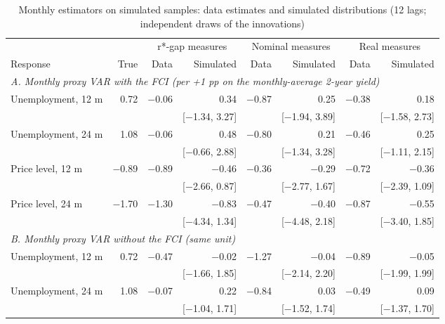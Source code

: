 \begin{table}[H]\centering\footnotesize\setlength{\tabcolsep}{3pt}
\caption{Monthly estimators on simulated samples: data estimates and simulated distributions (12 lags; independent draws of the innovations)}\label{tab:monthlyirfsimiid}
\begin{tabular}{lrrrrrrr}\toprule & & \multicolumn{2}{c}{r*-gap measures} & \multicolumn{2}{c}{Nominal measures} & \multicolumn{2}{c}{Real measures}\\ \cmidrule(lr){3-4}\cmidrule(lr){5-6}\cmidrule(lr){7-8}
Response & True & Data & Simulated & Data & Simulated & Data & Simulated\\ \midrule
\multicolumn{8}{l}{\textit{A. Monthly proxy VAR with the FCI (per +1 pp on the monthly-average 2-year yield)}}\\
\quad Unemployment, 12 m & 0.72 & $-$0.06 & 0.34 & $-$0.87 & 0.25 & $-$0.38 & 0.18\\
 &  &  & {\scriptsize [$-$1.34, 3.27]} &  & {\scriptsize [$-$1.94, 3.89]} &  & {\scriptsize [$-$1.58, 2.73]}\\
\quad Unemployment, 24 m & 1.08 & $-$0.06 & 0.48 & $-$0.80 & 0.21 & $-$0.46 & 0.25\\
 &  &  & {\scriptsize [$-$0.66, 2.88]} &  & {\scriptsize [$-$1.34, 3.28]} &  & {\scriptsize [$-$1.11, 2.15]}\\
\quad Price level, 12 m & $-$0.89 & $-$0.89 & $-$0.46 & $-$0.36 & $-$0.29 & $-$0.72 & $-$0.36\\
 &  &  & {\scriptsize [$-$2.66, 0.87]} &  & {\scriptsize [$-$2.77, 1.67]} &  & {\scriptsize [$-$2.39, 1.09]}\\
\quad Price level, 24 m & $-$1.70 & $-$1.30 & $-$0.83 & $-$0.47 & $-$0.40 & $-$0.87 & $-$0.55\\
 &  &  & {\scriptsize [$-$4.34, 1.34]} &  & {\scriptsize [$-$4.48, 2.18]} &  & {\scriptsize [$-$3.40, 1.85]}\\
\multicolumn{8}{l}{\textit{B. Monthly proxy VAR without the FCI (same unit)}}\\
\quad Unemployment, 12 m & 0.72 & $-$0.47 & $-$0.02 & $-$1.27 & $-$0.04 & $-$0.89 & $-$0.05\\
 &  &  & {\scriptsize [$-$1.66, 1.85]} &  & {\scriptsize [$-$2.14, 2.20]} &  & {\scriptsize [$-$1.99, 1.99]}\\
\quad Unemployment, 24 m & 1.08 & $-$0.07 & 0.22 & $-$0.84 & 0.03 & $-$0.49 & 0.09\\
 &  &  & {\scriptsize [$-$1.04, 1.71]} &  & {\scriptsize [$-$1.52, 1.74]} &  & {\scriptsize [$-$1.37, 1.70]}\\

\end{tabular}
\end{table}

